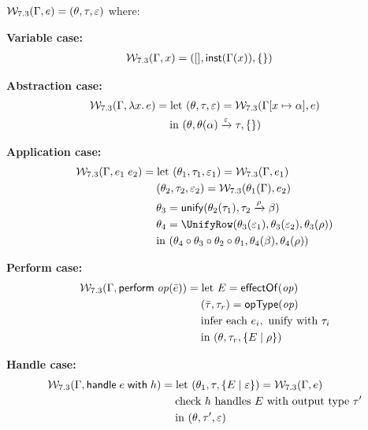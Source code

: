 \begin{definition}
\label{def:extended-alg-w}
$\mathcal{W}_{7.3}(\Gamma, e) = (\theta, \tau, \varepsilon)$ where:

\textbf{Variable case:}
\begin{align}
\mathcal{W}_{7.3}(\Gamma, x) &= ([], \mathsf{inst}(\Gamma(x)), \{\})
\end{align}

\textbf{Abstraction case:}
\begin{align}
\mathcal{W}_{7.3}(\Gamma, \lambda x.\, e) &= \text{let } (\theta, \tau, \varepsilon) = \mathcal{W}_{7.3}(\Gamma[x \mapsto \alpha], e) \\
    &\quad\; \text{in } (\theta, \theta(\alpha) \xrightarrow{\varepsilon} \tau, \{\})
\end{align}

\textbf{Application case:}
\begin{align}
\AlgW_{7.3}(\Gamma, e_1\; e_2) &= \text{let } (\Subst_1, \tau_1, \varepsilon_1) = \AlgW_{7.3}(\Gamma, e_1) \\
    &\quad\; (\Subst_2, \tau_2, \varepsilon_2) = \AlgW_{7.3}(\Subst_1(\Gamma), e_2) \\
    &\quad\; \Subst_3 = \Unify(\Subst_2(\tau_1), \tau_2 \xrightarrow{\rho} \beta) \\
    &\quad\; \Subst_4 = \UnifyRow(\Subst_3(\varepsilon_1), \Subst_3(\varepsilon_2), \Subst_3(\rho)) \\
    &\quad\; \text{in } (\Subst_4 \circ \Subst_3 \circ \Subst_2 \circ \Subst_1, \Subst_4(\beta), \Subst_4(\rho))
\end{align}

\textbf{Perform case:}
\begin{align}
\mathcal{W}_{7.3}(\Gamma, \mathsf{perform}\; \mathit{op}(\bar{e})) &= \text{let } E = \mathsf{effectOf}(\mathit{op}) \\
    &\quad\; (\bar{\tau}, \tau_r) = \mathsf{opType}(\mathit{op}) \\
    &\quad\; \text{infer each } e_i, \text{ unify with } \tau_i \\
    &\quad\; \text{in } (\theta, \tau_r, \{E \mid \rho\})
\end{align}

\textbf{Handle case:}
\begin{align}
\mathcal{W}_{7.3}(\Gamma, \mathsf{handle}\; e\; \mathsf{with}\; h) &= \text{let } (\theta_1, \tau, \{E \mid \varepsilon\}) = \mathcal{W}_{7.3}(\Gamma, e) \\
    &\quad\; \text{check } h \text{ handles } E \text{ with output type } \tau' \\
    &\quad\; \text{in } (\theta, \tau', \varepsilon)
\end{align}
\end{definition}

